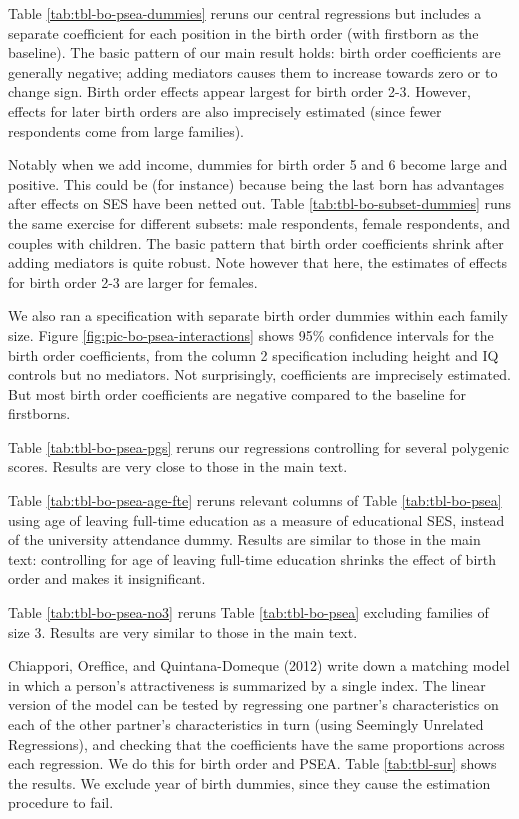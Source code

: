 \documentclass[
]{article}
\begin{document}
Table \ref{tab:tbl-bo-psea-dummies} reruns our central regressions but
includes a separate coefficient for each position in the birth order
(with firstborn as the baseline). The basic pattern of our main result
holds: birth order coefficients are generally negative; adding mediators
causes them to increase towards zero or to change sign. Birth order
effects appear largest for birth order 2-3. However, effects for later
birth orders are also imprecisely estimated (since fewer respondents
come from large families).

Notably when we add income, dummies for birth order 5 and 6 become large
and positive. This could be (for instance) because being the last born
has advantages after effects on SES have been netted out. Table
\ref{tab:tbl-bo-subset-dummies} runs the same exercise for different
subsets: male respondents, female respondents, and couples with
children. The basic pattern that birth order coefficients shrink after
adding mediators is quite robust. Note however that here, the estimates
of effects for birth order 2-3 are larger for females.

We also ran a specification with separate birth order dummies within
each family size. Figure \ref{fig:pic-bo-psea-interactions} shows 95\%
confidence intervals for the birth order coefficients, from the column 2
specification including height and IQ controls but no mediators. Not
surprisingly, coefficients are imprecisely estimated. But most birth
order coefficients are negative compared to the baseline for firstborns.

Table \ref{tab:tbl-bo-psea-pgs} reruns our regressions controlling for
several polygenic scores. Results are very close to those in the main
text.

Table \ref{tab:tbl-bo-psea-age-fte} reruns relevant columns of Table
\ref{tab:tbl-bo-psea} using age of leaving full-time education as a
measure of educational SES, instead of the university attendance dummy.
Results are similar to those in the main text: controlling for age of
leaving full-time education shrinks the effect of birth order and makes
it insignificant.

Table \ref{tab:tbl-bo-psea-no3} reruns Table \ref{tab:tbl-bo-psea}
excluding families of size 3. Results are very similar to those in the
main text.

Chiappori, Oreffice, and Quintana-Domeque (2012) write down a matching model in which a person's
attractiveness is summarized by a single index. The linear version of the
model can be tested by regressing one partner's characteristics on each of the
other partner's characteristics in turn (using Seemingly Unrelated
Regressions), and checking that the coefficients have the same proportions
across each regression. We do this for birth order and PSEA. Table
\ref{tab:tbl-sur} shows the results. We exclude year of birth dummies,
since they cause the estimation procedure to fail.
\end{document}

